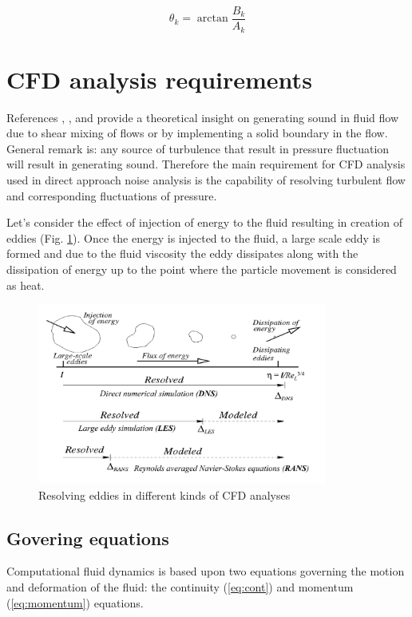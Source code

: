 \begin{equation} \label{eq:dftphase}
\theta_k = \arctan \frac{B_k}{A_k}
\end{equation}


\section{CFD analysis requirements} \label{cfdreq}
References \citep{Light1}, \citep{Light2}, \citep{FWH} and \citep{curle} provide a theoretical insight on generating sound in fluid flow due to shear mixing of flows or by implementing a solid boundary in the flow. General remark is: any source of turbulence that result in pressure fluctuation will result in generating sound. Therefore the main requirement for CFD analysis used in direct approach noise analysis is the capability of resolving turbulent flow and corresponding fluctuations of pressure.

Let's consider the effect of injection of energy to the fluid resulting in creation of eddies (Fig. \ref{CFDTypes}). Once the energy is injected to the fluid, a large scale eddy is formed and due to the fluid viscosity the eddy dissipates along with the dissipation of energy up to the point where the particle movement is considered as heat. 

\begin{figure}[h!]
\centering %
\includegraphics[width=0.85\textwidth]{Pictures/CFD_Types.png}
\caption{Resolving eddies in different kinds of CFD analyses}
\label{CFDTypes}
\end{figure}

\subsection{Govering equations} \label{goveq}
Computational fluid dynamics is based upon two equations governing the motion and deformation of the fluid: the continuity (\ref{eq:cont}) and momentum (\ref{eq:momentum}) equations.

